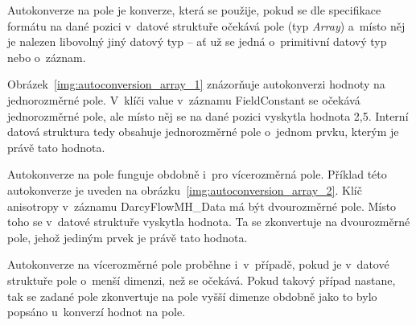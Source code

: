 \documentclass[FM,bw,DP]{tulthesis}
\begin{document}
Autokonverze na pole je konverze, která se použije, pokud se dle specifikace formátu na dané pozici v~datové struktuře očekává pole (typ \textit{Array}) a~místo něj je nalezen libovolný jiný datový typ -- ať už se jedná o~primitivní datový typ nebo o~záznam.

Obrázek~\ref{img:autoconversion_array_1} znázorňuje autokonverzi hodnoty na jednorozměrné pole. V~klíči value v~záznamu FieldConstant se očekává jednorozměrné pole, ale místo něj se na dané pozici vyskytla hodnota 2,5. Interní datová struktura tedy obsahuje jednorozměrné pole o~jednom prvku, kterým je právě tato hodnota.

Autokonverze na pole funguje obdobně i~pro vícerozměrná pole. Příklad této autokonverze je uveden na obrázku~\ref{img:autoconversion_array_2}. Klíč anisotropy v~záznamu DarcyFlowMH\_Data má být dvourozměrné pole. Místo toho se v~datové struktuře vyskytla hodnota. Ta se zkonvertuje na dvourozměrné pole, jehož jediným prvek je právě tato hodnota.

Autokonverze na vícerozměrné pole proběhne i~v~případě, pokud je v~datové struktuře pole o~menší dimenzi, než se očekává. Pokud takový případ nastane, tak se zadané pole zkonvertuje na pole vyšší dimenze obdobně jako to bylo popsáno u~konverzí hodnot na pole.
\end{document}
